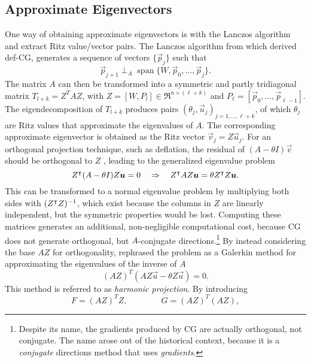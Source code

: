\documentclass{article}
\newcommand{\spa}{\operatorname{span}}
\begin{document}
\subsection{Approximate Eigenvectors}
\label{sub:approximate_eigenvectors}
One way of obtaining approximate eigenvectors is with the Lanczos algorithm and extract Ritz value/vector pairs. The Lanczos algorithm from which \citet{saad00} derived def-CG, generates a sequence of vectors $\{\vec{p}_j\}$  such that
\begin{equation*}
\vec{p}_{j+1} \perp_A \spa\{W,\vec{p}_0,...,\vec{p}_j\}.
\end{equation*} 
The matrix $A$ can then be transformed into a symmetric and partly tridiagonal matrix $T_{l+k}=Z^TAZ$, with $Z=[W,P_l]\in \Re^{n\times (\ell +k)}$ and $P_\ell=[\vec{p}_0,...,\vec{p}_{\ell-1}]$. The eigendecomposition of $T_{l+k}$ produces pairs $(\theta_j,\vec{u}_j)_{j=1,...,\ell+k}$, of which $\theta_j$ are Ritz values that approximate the eigenvalues of $A$. The corresponding approximate eigenvector is obtained as the Ritz vector $\vec{v}_j=Z \vec{u}_j$. For an orthogonal projection technique, such as deflation, the residual of $(A-\theta I)\vec{v}$ should be orthogonal to $Z$ \cite{chapman97}, leading to the generalized eigenvalue problem
\begin{equation*}
Z^{\intercal} (A-\theta I) Z \boldsymbol{u}=0 \quad \Rightarrow \quad Z^{\intercal} A Z\boldsymbol{u}=\theta Z^{\intercal} Z \boldsymbol{u}.
\end{equation*}
This can be transformed to a normal eigenvalue problem by multiplying both sides with $(Z^{\intercal} Z)^{-1}$, which exist because the columns in $Z$ are linearly independent, but the symmetric properties would be lost. Computing these matrices generates an additional, non-negligible computational cost, because CG does not generate orthogonal, but $A$-conjugate directions.\footnote{Despite its name, the gradients produced by CG are actually orthogonal, not conjugate. The name arose out of the historical context, because it is a \emph{conjugate} directions method that uses \emph{gradients}.} By instead considering the base $AZ$ for orthogonality, \citet{morgan95} rephrased the problem as a Galerkin method for approximating the eigenvalues of the inverse of $A$  
\begin{equation*}
(AZ)^T(AZ\vec{u} - \theta Z\vec{u})=0.
\end{equation*}
This method is referred to as \textit{harmonic projection}. %
By introducing 
\begin{equation*}
F=(AZ)^TZ, \qquad \qquad G=(AZ)^T(AZ),
\end{equation*}
\end{document}
